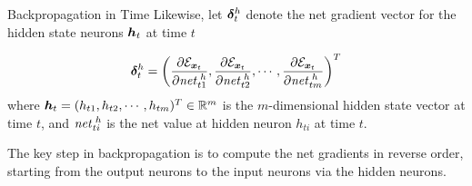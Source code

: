 \begin{frame}{Backpropagation in Time}
Likewise, let ${\bm \delta}^h_t$ denote the net gradient vector for the
hidden state neurons ${\boldsymbol h}_t$ at time $t$

\begin{align*}
    {\bm \delta}^h_t = \left(
        \frac{\partial {\mathcal E}_{{\boldsymbol x}_t}}{\partial \mathit{net}^{\;h}_{t1}},
        \frac{\partial {\mathcal E}_{{\boldsymbol x}_t}}{\partial \mathit{net}^{\;h}_{t2}},
                \cdots,
                \frac{\partial {\mathcal E}_{{\boldsymbol x}_t}}{\partial \mathit{net}^{\;h}_{tm}}
    \right)^T
\end{align*}
where ${\boldsymbol h}_t = (h_{t1}, h_{t2}, \cdots, h_{tm})^T \in {\mathord{\mathbb R}}^m$ is the
$m$-dimensional hidden state vector at time $t$, and $\mathit{net}^{\;h}_{ti}$ is
the net value at hidden neuron $h_{ti}$ at time $t$.

\medskip

The key step in backpropagation is to compute the net gradients in
reverse order, starting from the output neurons to the input neurons via
the hidden neurons. 
\end{frame}
%

